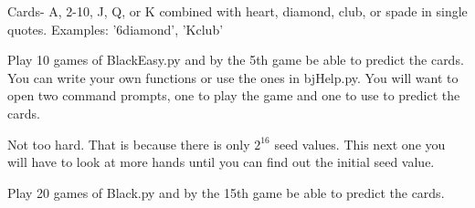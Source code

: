 Cards- A, 2-10, J, Q, or K combined with heart, diamond, club, or spade in single quotes. Examples: '6diamond', 'Kclub'



\begin{problem}
Play 10 games of BlackEasy.py and by the 5th game be able to predict the cards. You can write your own functions or use the ones in bjHelp.py. You will want to open two command prompts, one to play the game and one to use to predict the cards. 
\end{problem}

Not too hard. That is because there is only $2^{16}$ seed values. This next one you will have to look at more hands until you can find out the initial seed value.

\begin{problem}
Play 20 games of Black.py and by the 15th game be able to predict the cards.
\end{problem}



